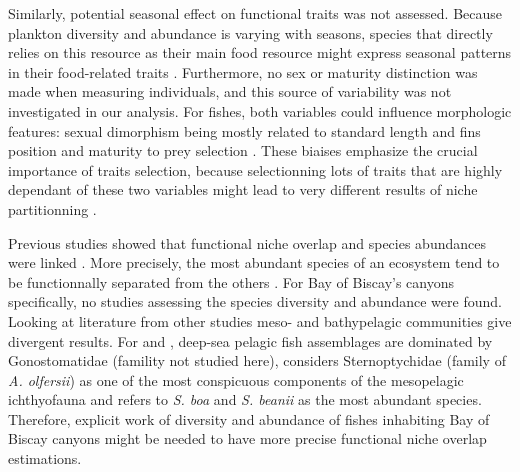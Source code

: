 Similarly, potential seasonal effect on functional traits was not assessed. Because plankton diversity and abundance is varying with seasons, species that directly relies on this resource as their main food resource might express seasonal patterns in their food-related traits \citep{kremer2017}. Furthermore, no sex or maturity distinction was made when measuring individuals, and this source of variability was not investigated in our analysis. For fishes, both variables could influence morphologic features: sexual dimorphism being mostly related to standard length and fins position and maturity to prey selection \citep{geidner2008,nagelkerke2018}. These biaises emphasize the crucial importance of traits selection, because selectionning lots of traits that are highly dependant of these two variables might lead to very different results of niche partitionning \citep{dasilva2019,dumay2004,nagelkerke2018}.

Previous studies showed that functional niche overlap and species abundances were linked \citep{aneeshkumar2017,mason2008}. More precisely, the most abundant species of an ecosystem tend to be functionnally separated from the others \citep{farre2016}. For Bay of Biscay's canyons specifically, no studies assessing the species diversity and abundance were found. Looking at literature from other studies meso- and bathypelagic communities give divergent results. For \citet{garcia2021} and \cite{kenchington2020}, deep-sea pelagic fish assemblages are dominated by Gonostomatidae (famility not studied here), \citet{eduardo2020} considers Sternoptychidae (family of \textit{A. olfersii}) as one of the most conspicuous components of the mesopelagic ichthyofauna and \citep{sutton2008} refers to \textit{S. boa} and \textit{S. beanii} as the most abundant species. Therefore, explicit work of diversity and abundance of fishes inhabiting Bay of Biscay canyons might be needed to have more precise functional niche overlap estimations.


